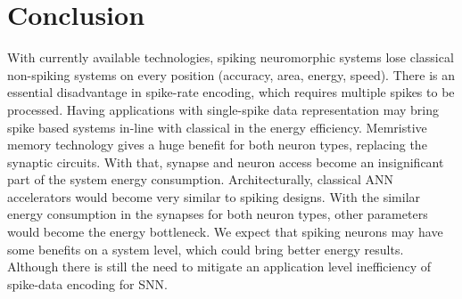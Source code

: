 \documentclass[conference, compsoc]{IEEEtran}
\begin{document}
\section{Conclusion}
With currently available technologies, spiking neuromorphic systems lose classical non-spiking systems on every position (accuracy, area, energy, speed). There is an essential disadvantage in spike-rate encoding, which requires multiple spikes to be processed. Having applications with single-spike data representation may bring spike based systems in-line with classical in the energy efficiency. Memristive memory technology gives a huge benefit for both neuron types, replacing the synaptic circuits. With that, synapse and neuron access become an insignificant part of the system energy consumption. Architecturally, classical ANN accelerators would become very similar to spiking designs. With the similar energy consumption in the synapses for both neuron types, other parameters would become the energy bottleneck. We expect that spiking neurons may have some benefits on a system level, which could bring better energy results. Although there is still the need to mitigate an application level inefficiency of spike-data encoding for SNN.


{}



\end{document}
